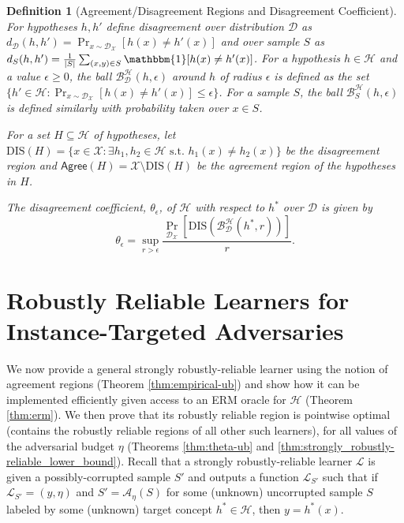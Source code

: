 \documentclass[11pt]{article}
\newtheorem{definition}{Definition}
\newcommand{\0}{\mathbf{0}}
\newcommand{\1}{\mathbf{1}}
\newcommand{\cA}{\mathcal{A}}
\newcommand{\cB}{\mathcal{B}}
\newcommand{\cD}{\mathcal{D}}
\newcommand{\cH}{\mathcal{H}}
\newcommand{\cL}{\mathcal{L}}
\newcommand{\cX}{\mathcal{X}}
\newcommand{\Agree}{\mathsf{Agree}}
\begin{document}
\begin{definition}[Agreement/Disagreement Regions and Disagreement Coefficient] For hypotheses $h,h'$ define disagreement over distribution $\cD$ as $d_{\cD}(h,h')=\Pr_{x\sim \cD_\cX}[h(x) \ne h'(x)]$ and over sample $S$ as $d_{S}(h,h')=\frac{1}{|S|}\sum_{(x,y)\in S}\mathbbm{1}[h(x) \ne h'(x)]$.  For a hypothesis $h\in\cH$ and a value $\epsilon\ge 0$, the ball $\cB^{\cH}_{\cD}(h,\epsilon)$ around $h$
of radius $\epsilon$ is defined as the set $\{h' \in \cH : \Pr_{x\sim \cD_\cX}[h(x) \ne h'(x)] \le \epsilon\}$. For a sample $S$, the ball $\cB^{\cH}_{S}(h,\epsilon)$ is defined similarly with probability taken over $x\in S$.

For a set $H \subseteq \cH$ of hypotheses, let $\text{DIS}(H)= \{x \in \cX : \exists h_1, h_2 \in \cH \text{ s.t. } h_1(x) \ne h_2(x)\} $ be the disagreement region and $\Agree(H)=\cX\setminus\text{DIS}(H)$ be the agreement region of the hypotheses in $H$.

The disagreement coefficient, $\theta_\epsilon$,  of $\cH$ with respect to $h^*$ over $\cD$ is given by
\[\theta_\epsilon=\sup_{r> \epsilon}\frac{\Pr_{\cD_\cX}
[\text{DIS}(\cB_\cD^\cH(h^*, r))]}{r}.\]
\vspace*{-0.3in}


\label{def:dis}
\end{definition}


\section{Robustly Reliable Learners for Instance-Targeted Adversaries} \label{sec:nastynoise}

We now provide a general strongly robustly-reliable learner using the notion of agreement regions (Theorem \ref{thm:empirical-ub}) and show how it can be implemented efficiently given access to an ERM oracle for $\cH$ (Theorem \ref{thm:erm}). We then prove that its robustly reliable region is pointwise optimal (contains the robustly reliable regions of all other such learners), for all values of the adversarial budget $\eta$ (Theorems \ref{thm:theta-ub} and  \ref{thm:strongly_robustly-reliable_lower_bound}).  Recall that a strongly robustly-reliable learner $\cL$ is given a possibly-corrupted sample $S'$ and outputs a function $\cL_{S'}$ such that if $\cL_{S'} = (y,\eta)$ and $S' = \cA_\eta(S)$ for some (unknown) uncorrupted sample $S$ labeled by some (unknown) target concept $h^* \in \cH$, then $y=h^*(x)$.
\end{document}
